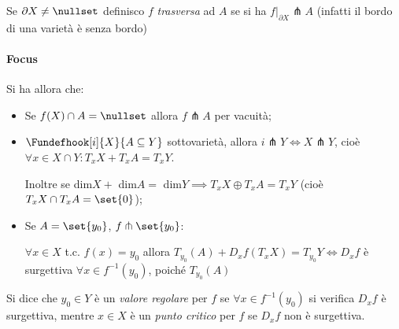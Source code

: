 \begin{defn}
Se $\partial X \neq \nullset$ definisco $f$ \emph{trasversa} ad $A$ se si ha $f|_{\partial X} \pitchfork A$ (infatti il bordo di una varietà è senza bordo)
\end{defn}

\paragraph{Focus}
Si ha allora che:
\begin{itemize}
\item Se $f(X) \cap A = \nullset$ allora $f \pitchfork A$ per vacuità;
\item $\Fundefhook[i]{X}{A \subseteq Y}$ sottovarietà, allora $i \pitchfork Y \iff X \pitchfork Y$, cioè $\forall x \in X\cap Y: T_xX + T_xA = T_xY$.

Inoltre se dim$X +$ dim$A =$ dim$Y \implies T_xX \oplus T_xA = T_xY$ (cioè $T_xX \cap T_xA = \set{0}$);
\item Se $A = \set{y_0}$, $f \pitchfork \set{y_0}$:

$\forall x \in X$ t.c. $f(x) = y_0$ allora $T_{y_0}(A) + D_xf(T_xX) = T_{y_0}Y \iff D_xf$ è surgettiva $\forall x \in f^{-1}(y_0)$, poiché $T_{y_0}(A)$
\end{itemize}

\begin{defn}
Si dice che $y_0 \in Y$ è un \emph{valore regolare} per $f$ se $\forall x \in f^{-1}(y_0)$ si verifica $D_xf$ è surgettiva, mentre $x \in X$ è un \emph{punto critico} per $f$ se $D_xf$ non è surgettiva.
\end{defn}
